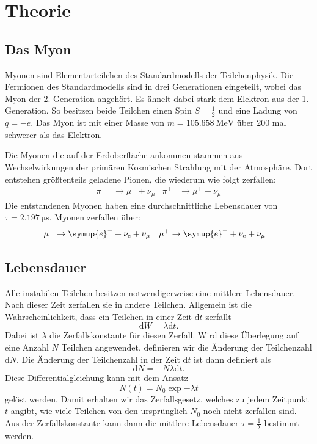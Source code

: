 \section{Theorie}
\label{sec:Theorie}

\subsection{Das Myon}
\label{ssec:myon}

Myonen sind Elementarteilchen des Standardmodells der Teilchenphysik.
Die Fermionen des Standardmodells sind in drei Generationen eingeteilt, wobei das Myon der 2. Generation angehört.
Es ähnelt dabei stark dem Elektron aus der 1. Generation. 
So besitzen beide Teilchen einen Spin $S = \frac{1}{2}$ und eine Ladung von $q = -e$.
Das Myon ist mit einer Masse von $m = \qty{105.658}{\MeV}$ über 200 mal schwerer als das Elektron.

Die Myonen die auf der Erdoberfläche ankommen stammen aus Wechselwirkungen der primären Kosmischen Strahlung mit der Atmosphäre.
Dort entstehen größtenteils geladene Pionen, die wiederum wie folgt zerfallen:
\begin{align*}
    \pi^- &\rightarrow \mu^- + \bar{\nu}_{\mu} & \pi^+ &\rightarrow \mu^+ + \nu_{\mu}
\end{align*}
Die entstandenen Myonen haben eine durchschnittliche Lebensdauer von $\tau = \qty{2.197}{\micro\second}$.
Myonen zerfallen über:
\begin{align*}
    \mu^- &\rightarrow \symup{e}^- + \bar{\nu}_\text{e} + \nu_{\mu} & \mu^+ &\rightarrow \symup{e}^+ + \nu_{\text{e}} + \bar{\nu}_{\mu}
\end{align*}
\subsection{Lebensdauer}
\label{ssec:lebensdauer}

Alle instabilen Teilchen besitzen notwendigerweise eine mittlere Lebensdauer.
Nach dieser Zeit zerfallen sie in andere Teilchen.
Allgemein ist die Wahrscheinlichkeit, dass ein Teilchen in einer Zeit $\text{d}t$ zerfällt 
\begin{equation}
    \text{d}W = \lambda \text{d}t.
\end{equation}
Dabei ist $\lambda$ die Zerfallskonstante für diesen Zerfall.
Wird diese Überlegung auf eine Anzahl $N$ Teilchen angewendet, definieren wir die Änderung der Teilchenzahl $\text{d}N$.
Die Änderung der Teilchenzahl in der Zeit $\text{d}t$ ist dann definiert als
\begin{equation}
    \text{d}N = - N \lambda \text{d}t.
\end{equation}
Diese Differentialgleichung kann mit dem Ansatz 
\begin{equation}
    N(t) = N_0 \exp{- \lambda t}
\end{equation}
gelöst werden.
Damit erhalten wir das Zerfallsgesetz, welches zu jedem Zeitpunkt $t$ angibt, wie viele Teilchen von den ursprünglich $N_0$ noch nicht zerfallen sind.
Aus der Zerfallskonstante kann dann die mittlere Lebensdauer $\tau = \frac{1}{\lambda}$ bestimmt werden.